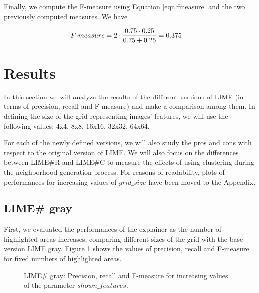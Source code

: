 \documentclass[12pt, twoside, a4paper]{report}
\begin{document}
Finally, we compute the F-measure using Equation \ref{eqn:fmeasure} and the two previously computed measures. We have

\begin{align*}
F\textnormal{-}measure 
&= 2 \cdot \frac{0.75 \cdot 0.25}{0.75 + 0.25} = 0.375
\end{align*}

\section{Results}

In this section we will analyze the results of the different versions of LIME (in terms of precision, recall and F-measure) and make a comparison among them. In defining the size of the grid representing images' features, we will use the following values: 4x4, 8x8, 16x16, 32x32, 64x64.

For each of the newly defined versions, we will also study the pros and cons with respect to the original version of LIME. We will also focus on the differences between LIME\#R and LIME\#C to measure the effects of using clustering during the neighborhood generation process. For reasons of readability, plots of performances for increasing values of $grid\_size$ have been moved to the Appendix.

\subsection{LIME\# gray}

First, we evaluated the performances of the explainer as the number of highlighted areas increases, comparing different sizes of the grid with the base version LIME gray. Figure \ref{subfig:limesharp_gray_vs_sf} shows the values of precision, recall and F-measure for fixed numbers of highlighted areas. 


\begin{figure}
\centering


\hspace{-4mm} 
\caption{LIME\# gray: Precision, recall and F-measure for increasing values of the parameter $shown\_features$.}
\label{subfig:limesharp_gray_vs_sf}
\end{figure}
\end{document}
